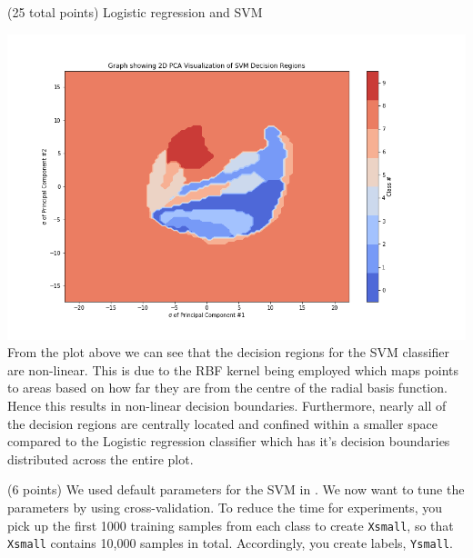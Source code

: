 \documentclass[12pt]{article}
\begin{document}
\begin{question}{(25 total points) Logistic regression and SVM}
\begin{subquestion}
      \begin{answerbox}{35em}
         \includegraphics[width = 1.0\textwidth]{q2_4.png}
         From the plot above we can see that the decision regions for the SVM classifier are non-linear. This is due to the RBF kernel being employed which maps points to areas based on how far they are from the centre of the radial basis function. Hence this results in non-linear decision boundaries. Furthermore, nearly all of the decision regions are centrally located and confined within a smaller space compared to the Logistic regression classifier which has it's decision boundaries distributed across the entire plot.
      \end{answerbox}
  


   \end{subquestion}

   \begin{subquestion}{(6 points)
       We used default parameters for the SVM in .
       We now want to tune the parameters by using cross-validation.
       To reduce the time for experiments, you pick up the first 1000
       training samples from each class to create \texttt{Xsmall}, so that \texttt{Xsmall}
       contains 10,000 samples in total. Accordingly, you create
       labels, \texttt{Ysmall}.
     } \label{Q2.5}


   


\end{subquestion}
\end{question}
\end{document}
